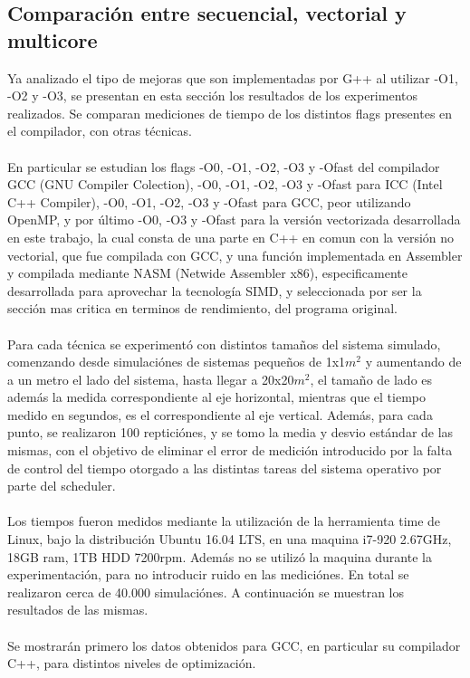 
\subsection{Comparación entre secuencial, vectorial y multicore}
Ya analizado el tipo de mejoras que son implementadas por G++ al utilizar -O1, -O2 y -O3, se presentan en esta sección los resultados de los experimentos realizados. Se comparan mediciones de tiempo de los distintos flags presentes en el compilador, con otras técnicas. 
~\\
~\\
En particular se estudian los flags -O0, -O1, -O2, -O3 y -Ofast del compilador GCC (GNU Compiler Colection), -O0, -O1, -O2, -O3 y -Ofast para ICC (Intel C++ Compiler), -O0, -O1, -O2, -O3 y -Ofast para GCC, peor utilizando OpenMP, y por último -O0, -O3 y -Ofast para la versión vectorizada desarrollada en este trabajo, la cual consta de una parte en C++ en comun con la versión no vectorial, que fue compilada con GCC, y una función implementada en Assembler y compilada mediante NASM (Netwide Assembler x86), especificamente desarrollada para aprovechar la tecnología SIMD, y seleccionada por ser la sección mas critica en terminos de rendimiento, del programa original.
~\\
~\\
Para cada técnica se experimentó con distintos tamaños del sistema simulado, comenzando desde simulaciónes de sistemas pequeños de 1x1$m^2$ y aumentando de a un metro el lado del sistema, hasta llegar a 20x20$m^2$, el tamaño de lado es además la medida correspondiente al eje horizontal, mientras que el tiempo medido en segundos, es el correspondiente al eje vertical. Además, para cada punto, se realizaron 100 repticiónes, y se tomo la media y desvio estándar de las mismas, con el objetivo de eliminar el error de medición introducido por la falta de control del tiempo otorgado a las distintas tareas del sistema operativo por parte del scheduler. 
~\\
~\\
Los tiempos fueron medidos mediante la utilización de la herramienta time de Linux, bajo la distribución Ubuntu 16.04 LTS, en una maquina i7-920 2.67GHz, 18GB ram, 1TB HDD 7200rpm. Además no se utilizó la maquina durante la experimentación, para no introducir ruido en las mediciónes. En total se realizaron cerca de 40.000 simulaciónes. A continuación se muestran los resultados de las mismas.
~\\
~\\
Se mostrarán primero los datos obtenidos para GCC, en particular su compilador C++, para distintos niveles de optimización.
